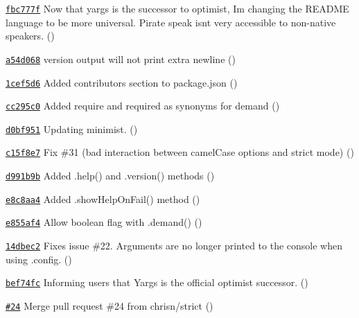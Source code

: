 \begin{DoxyItemize}
\item \href{https://github.com/bcoe/yargs/commit/fbc777f416eeefd37c84e44d27d7dfc7c1925721}{\tt fbc777f} Now that yargs is the successor to optimist, I\textquotesingle{}m changing the R\+E\+A\+D\+ME language to be more universal. Pirate speak isn\textquotesingle{}t very accessible to non-\/native speakers. ()
\item \href{https://github.com/bcoe/yargs/commit/a54d0682ae2efc2394d407ab171cc8a8bbd135ea}{\tt a54d068} version output will not print extra newline ()
\item \href{https://github.com/bcoe/yargs/commit/1cef5d62a9d6d61a3948a49574892e01932cc6ae}{\tt 1cef5d6} Added contributors section to package.\+json ()
\item \href{https://github.com/bcoe/yargs/commit/cc295c0a80a2de267e0155b60d315fc4b6f7c709}{\tt cc295c0} Added \textquotesingle{}require\textquotesingle{} and \textquotesingle{}required\textquotesingle{} as synonyms for \textquotesingle{}demand\textquotesingle{} ()
\item \href{https://github.com/bcoe/yargs/commit/d0bf951d949066b6280101ed606593d079ee15c8}{\tt d0bf951} Updating minimist. ()
\item \href{https://github.com/bcoe/yargs/commit/c15f8e7f245b261e542cf205ce4f4313630cbdb4}{\tt c15f8e7} Fix \#31 (bad interaction between camel\+Case options and strict mode) ()
\item \href{https://github.com/bcoe/yargs/commit/d991b9be687a68812dee1e3b185ba64b7778b82d}{\tt d991b9b} Added .help() and .version() methods ()
\item \href{https://github.com/bcoe/yargs/commit/e8c8aa46268379357cb11e9fc34b8c403037724b}{\tt e8c8aa4} Added .show\+Help\+On\+Fail() method ()
\item \href{https://github.com/bcoe/yargs/commit/e855af4a933ea966b5bbdd3c4c6397a4bac1a053}{\tt e855af4} Allow boolean flag with .demand() ()
\item \href{https://github.com/bcoe/yargs/commit/14dbec24fb7380683198e2b20c4deb8423e64bea}{\tt 14dbec2} Fixes issue \#22. Arguments are no longer printed to the console when using .config. ()
\item \href{https://github.com/bcoe/yargs/commit/bef74fcddc1544598a804f80d0a3728459f196bf}{\tt bef74fc} Informing users that Yargs is the official optimist successor. ()
\item \href{https://github.com/bcoe/yargs/pull/24}{\tt \#24} Merge pull request \#24 from chrisn/strict ()

\end{DoxyItemize}

